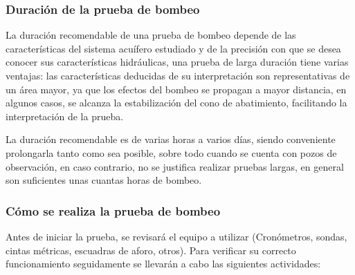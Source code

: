 \subsubsection{Duración de la prueba de bombeo}
La duración recomendable de una prueba de bombeo depende de las características del sistema acuífero estudiado y de la precisión con que se desea conocer sus características hidráulicas, una prueba de larga duración tiene varias ventajas: las características deducidas de su interpretación son representativas de un área mayor, ya que los efectos del bombeo se propagan a mayor distancia, en algunos casos, se alcanza la estabilización del cono de abatimiento, facilitando la interpretación de la prueba.

La duración recomendable es de varias horas a varios días, siendo conveniente prolongarla tanto como sea posible, sobre todo cuando se cuenta con pozos de observación, en caso contrario, no se justifica realizar pruebas largas, en general son suficientes unas cuantas horas de bombeo.
\subsubsection{Cómo se realiza la prueba de bombeo}
Antes de iniciar la prueba, se revisará el equipo a utilizar (Cronómetros, sondas, cintas métricas, escuadras de aforo, otros). Para verificar su correcto funcionamiento seguidamente se llevarán a cabo las siguientes actividades:

